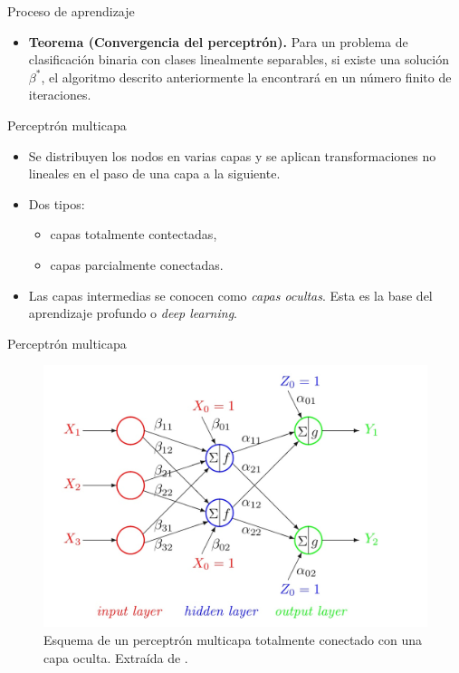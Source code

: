 \documentclass[spanish]{beamer}
\begin{document}
\begin{frame}{Proceso de aprendizaje}
  \begin{itemize}
    \item \textbf{Teorema (Convergencia del perceptrón). } Para un problema de clasificación binaria con clases linealmente separables, si existe una solución $\beta^\ast$, el algoritmo descrito anteriormente la encontrará en un número finito de iteraciones.
  \end{itemize}
\end{frame}

\begin{frame}{Perceptrón multicapa}
  \begin{itemize}
    \item Se distribuyen los nodos en varias capas y se aplican transformaciones no lineales en el paso de una capa a la siguiente.
    \item Dos tipos:
    \begin{itemize}
      \item capas totalmente contectadas,
      \item capas parcialmente conectadas.
    \end{itemize}
  \item Las capas intermedias se conocen como \textit{capas ocultas}. Esta es la base del aprendizaje profundo o \textit{deep learning}.
  \end{itemize}
\end{frame}

\begin{frame}{Perceptrón multicapa}

  \begin{figure}[h]
  \centering
  \includegraphics[width=.7\textwidth]{img/multicapa}
  \caption{Esquema de un perceptrón multicapa totalmente conectado con una capa oculta. Extraída de \parencite{izenman_modern_2008}.}
  \label{fig:multi}
\end{figure}

\end{frame}
\end{document}

